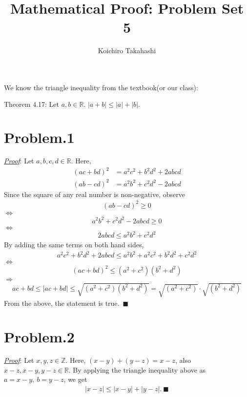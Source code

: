 \documentclass[12pt]{article}
\begin{document}
\title{Mathematical Proof: Problem Set 5}
\author{Koichiro Takahashi}
\maketitle 
\noindent We know the triangle inequality from the textbook(or our class):
\begin{center}
Theorem 4.17:
Let $a,b \in \mathbb{R}$. $|a+b| \leq |a| + |b|$.
\end{center}

\section*{Problem.1}
\underline{\textit{Proof}}: Let $a, b, c, d \in \mathbb{R}$.
Here,
\begin{align*}
(ac+bd)^2 &= a^2 c^2 + b^2 d^2 + 2abcd\\[1em]
(ab-cd)^2 &= a^2 b^2 + c^2 d^2 - 2abcd
\end{align*}
Since the square of any real number is non-negative, observe
\begin{gather*}
(ab - cd)^2 \geq 0
\end{gather*}
$\Leftrightarrow$
\begin{gather*}
a^2 b^2 + c^2 d^2 - 2abcd \geq 0
\end{gather*}
$\Leftrightarrow$
\begin{gather*}
2abcd \leq a^2 b^2 + c^2 d^2
\end{gather*}
By adding the same terms on both hand sides,
\begin{gather*}
a^2 c^2 + b^2 d^2 + 2abcd \leq a^2 b^2 + a^2 c^2 + b^2 d^2 + c^2 d^2
\end{gather*}
$\Leftrightarrow$
\begin{gather*}
(ac+bd)^2 \leq (a^2 + c^2)(b^2 + d^2)
\end{gather*}
$\Rightarrow$
\begin{gather*}
ac+bd \leq |ac+bd| \leq \sqrt{(a^2 + c^2)(b^2 + d^2)} = \sqrt{(a^2 + c^2)} \cdot \sqrt{(b^2 + d^2)}
\end{gather*}
From the above, the statement is true.~$\blacksquare$

\section*{Problem.2}
\underline{\textit{Proof}}: Let $x, y, z \in \mathbb{Z}$.
Here, $(x-y) + (y-z) = x-z$, also $x-z,x-y,y-z \in \mathbb{R}$. By applying the triangle inequality above as $a = x-y,~b = y-z$, we get
\begin{gather*}
|x-z| \leq |x-y| + |y-z|. ~\blacksquare
\end{gather*}
\end{document}
